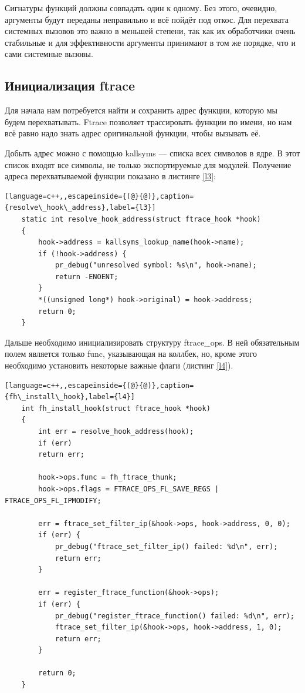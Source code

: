 Сигнатуры функций должны совпадать один к одному. Без этого, очевидно, аргументы будут переданы неправильно и всё пойдёт под откос. Для перехвата системных вызовов это важно в меньшей степени, так как их обработчики очень стабильные и для эффективности аргументы принимают в том же порядке, что и сами системные вызовы.

\subsection{Инициализация ftrace}
Для начала нам потребуется найти и сохранить адрес функции, которую мы будем перехватывать. Ftrace позволяет трассировать функции по имени, но нам всё равно надо знать адрес оригинальной функции, чтобы вызывать её.

Добыть адрес можно с помощью kallsyms — списка всех символов в ядре. В этот список входят все символы, не только экспортируемые для модулей. Получение адреса перехватываемой функции показано в листинге \ref{l3}:
\begin{lstlisting}[language=c++,,escapeinside={(@}{@)},caption={resolve\_hook\_address},label={l3}]
	static int resolve_hook_address(struct ftrace_hook *hook)
	{
		hook->address = kallsyms_lookup_name(hook->name);
		if (!hook->address) {
			pr_debug("unresolved symbol: %s\n", hook->name);
			return -ENOENT;
		}
		*((unsigned long*) hook->original) = hook->address;
		return 0;
	}
\end{lstlisting}

Дальше необходимо инициализировать структуру ftrace\_ops. В ней обязательным полем является только func, указывающая на коллбек, но, кроме этого необходимо установить некоторые важные флаги (листинг \ref{l4}).
\newpage
\begin{lstlisting}[language=c++,,escapeinside={(@}{@)},caption={fh\_install\_hook},label={l4}]
	int fh_install_hook(struct ftrace_hook *hook)
	{
		int err = resolve_hook_address(hook);
		if (err)
		return err;
		
		hook->ops.func = fh_ftrace_thunk;
		hook->ops.flags = FTRACE_OPS_FL_SAVE_REGS | FTRACE_OPS_FL_IPMODIFY;
		
		err = ftrace_set_filter_ip(&hook->ops, hook->address, 0, 0);
		if (err) {
			pr_debug("ftrace_set_filter_ip() failed: %d\n", err);
			return err;
		}
		
		err = register_ftrace_function(&hook->ops);
		if (err) {
			pr_debug("register_ftrace_function() failed: %d\n", err);
			ftrace_set_filter_ip(&hook->ops, hook->address, 1, 0);
			return err;
		}
		
		return 0;
	}
\end{lstlisting}

